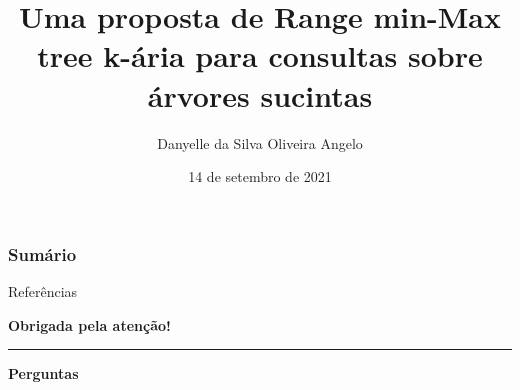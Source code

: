 \documentclass[pt]{ifbclass/apresentacao-ifb}
\author{Danyelle da Silva Oliveira Angelo}
\title{Uma proposta de Range min-Max tree k-ária para consultas sobre árvores sucintas}
\institute{Instituto Federal de Brasília, Câmpus Taguatinga}
\date{14 de setembro de 2021}
\begin{document}
\maketitle

\begin{frame}{}
	\frametitle{Sumário}
	\tableofcontents[sectionstyle=show/show]
\end{frame}








\begin{frame}[allowframebreaks]{Referências}
    
    
\end{frame}


\begin{frame}{}
    \centering
  \textbf{Obrigada pela atenção!}
  
  \vspace{0.4cm}
  
  \rule[0.4cm]{6cm}{0.6pt}
  
  \textbf{Perguntas}
\end{frame}
\end{document}
